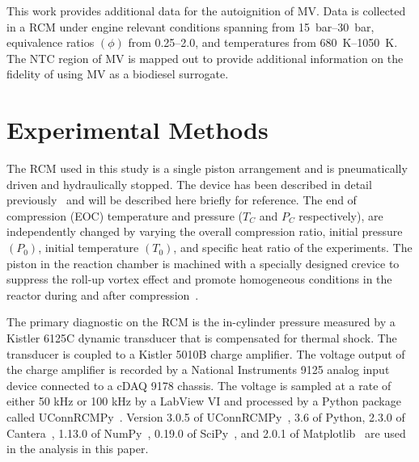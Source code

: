\documentclass[letterpaper, review, sort&compress]{elsarticle}
\begin{document}
This work provides additional data for the autoignition of MV. Data is collected in a RCM under
engine relevant conditions spanning from \SIrange{15}{30}{\bar}, equivalence ratios \((\phi)\) from
\numrange{0.25}{2.0}, and temperatures from \SIrange{680}{1050}{\K}. The NTC region of MV is mapped
out to provide additional information on the fidelity of using MV as a biodiesel surrogate.

\section{Experimental Methods}\label{sec:experimental-methods}

The RCM used in this study is a single piston arrangement and is pneumatically driven and
hydraulically stopped. The device has been described in detail previously~\cite{Mittal2007a} and
will be described here briefly for reference. The end of compression (EOC) temperature and pressure
(\(T_C\) and \(P_C\) respectively), are independently changed by varying the overall compression
ratio, initial pressure \((P_0)\), initial temperature \((T_0)\), and specific heat ratio of the
experiments. The piston in the reaction chamber is machined with a specially designed crevice to
suppress the roll-up vortex effect and promote homogeneous conditions in the reactor during and
after compression~\cite{Mittal2006}.

The primary diagnostic on the RCM is the in-cylinder pressure measured by a Kistler 6125C dynamic
transducer that is compensated for thermal shock. The transducer is coupled to a Kistler 5010B
charge amplifier. The voltage output of the charge amplifier is recorded by a National Instruments
9125 analog input device connected to a cDAQ 9178 chassis. The voltage is sampled at a rate of
either 50 kHz or 100 kHz by a LabView VI and processed by a Python package called
UConnRCMPy~\cite{Weber2016a}. Version 3.0.5 of UConnRCMPy~\cite{uconnrcmpy}, 3.6 of Python, 2.3.0
of Cantera~\cite{cantera}, 1.13.0 of NumPy~\cite{vanderWalt2011}, 0.19.0 of SciPy~\cite{Jones2001},
and 2.0.1 of Matplotlib~\cite{Hunter2007} are used in the analysis in this paper.
\end{document}
